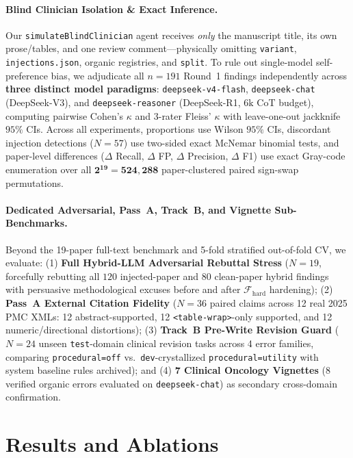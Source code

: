 \documentclass[11pt,a4paper]{article}
\begin{document}
\paragraph{Blind Clinician Isolation \& Exact Inference.}
Our \texttt{simulateBlindClinician} agent receives \emph{only} the manuscript title, its own prose/tables, and one review comment---physically omitting \texttt{variant}, \texttt{injections.json}, organic registries, and \texttt{split}. To rule out single-model self-preference bias, we adjudicate all $n=191$ Round~1 findings independently across \textbf{three distinct model paradigms}: \texttt{deepseek-v4-flash}, \texttt{deepseek-chat} (DeepSeek-V3), and \texttt{deepseek-reasoner} (DeepSeek-R1, $6\text{k}$ CoT budget), computing pairwise Cohen's $\kappa$ and 3-rater Fleiss' $\kappa$ \cite{fleiss1971kappa} with leave-one-out jackknife $95\%$ CIs. Across all experiments, proportions use Wilson $95\%$ CIs, discordant injection detections ($N=57$) use two-sided exact McNemar binomial tests, and paper-level differences ($\Delta$ Recall, $\Delta$ FP, $\Delta$ Precision, $\Delta$ F1) use exact Gray-code enumeration over all $\mathbf{2^{19} = 524{,}288}$ paper-clustered paired sign-swap permutations.

\paragraph{Dedicated Adversarial, Pass~A, Track~B, and Vignette Sub-Benchmarks.}
Beyond the 19-paper full-text benchmark and 5-fold stratified out-of-fold CV, we evaluate: (1) \textbf{Full Hybrid-LLM Adversarial Rebuttal Stress} ($N=19$, forcefully rebutting all $120$ injected-paper and $80$ clean-paper hybrid findings with persuasive methodological excuses before and after $\mathcal{F}_{\text{hard}}$ hardening); (2) \textbf{Pass~A External Citation Fidelity} ($N=36$ paired claims across 12 real 2025 PMC XMLs: 12 abstract-supported, 12 \texttt{<table-wrap>}-only supported, and 12 numeric/directional distortions); (3) \textbf{Track~B Pre-Write Revision Guard} ($N=24$ unseen \texttt{test}-domain clinical revision tasks across 4 error families, comparing \texttt{procedural=off} vs.\ \texttt{dev}-crystallized \texttt{procedural=utility} with system baseline rules archived); and (4) \textbf{7 Clinical Oncology Vignettes} ($8$ verified organic errors evaluated on \texttt{deepseek-chat}) as secondary cross-domain confirmation.

\section{Results and Ablations}
\label{sec:results}
\end{document}
